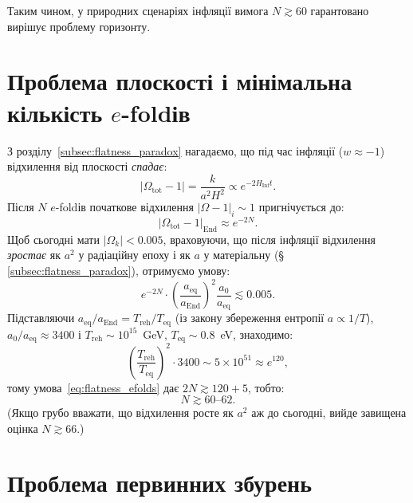 Таким чином, у природних сценаріях інфляції вимога $N \gtrsim 60$
гарантовано вирішує проблему горизонту.

\section{Проблема плоскості і мінімальна кількість $e$-foldів}
\label{sec:flatness_efolds}

З розділу~\ref{subsec:flatness_paradox} нагадаємо, що під час інфляції
($w \approx -1$) відхилення від плоскості \emph{спадає}:
\begin{equation*}
	|\Omega_{\text{tot}} - 1| = \frac{k}{a^2 H^2} \propto e^{-2H_{\text{Inf}} t}.
\end{equation*}
Після $N$ $e$-foldів початкове відхилення $|\Omega - 1|_i \sim 1$
пригнічується до:
\begin{equation*}
	|\Omega_{\text{tot}} - 1|_{\text{End}} \approx e^{-2N}.
\end{equation*}
Щоб сьогодні мати $|\Omega_k| < 0.005$, враховуючи, що після інфляції
відхилення \emph{зростає} як $a^2$ у радіаційну епоху і як $a$ у матеріальну
(§\,\ref{subsec:flatness_paradox}), отримуємо умову:
\begin{equation}\label{eq:flatness_efolds}
	e^{-2N} \cdot \left(\frac{a_{\text{eq}}}{a_{\text{End}}}\right)^2\frac{a_0}{a_{\text{eq}}} \lesssim 0.005.
\end{equation}
Підставляючи $a_{\text{eq}}/a_{\text{End}} = T_{\text{reh}}/T_{\text{eq}}$
(із закону збереження ентропії $a \propto 1/T$), $a_0/a_{\text{eq}} \approx 3400$ і
$T_{\text{reh}} \sim 10^{15}$~GeV, $T_{\text{eq}} \sim 0.8$~eV, знаходимо:
\begin{equation*}
	\left(\frac{T_{\text{reh}}}{T_{\text{eq}}}\right)^2\cdot 3400 \sim 5\times 10^{51} \approx e^{120},
\end{equation*}
тому умова~\eqref{eq:flatness_efolds} дає $2N \gtrsim 120 + 5$, тобто:
\begin{equation}\label{eq:N_min}
	\boxed{N \gtrsim 60\text{--}62.}
\end{equation}
(Якщо грубо вважати, що відхилення росте як $a^2$ аж до сьогодні, вийде завищена оцінка $N\gtrsim66$.)

\section{Проблема первинних збурень}
\label{sec:primordial_perturbations_bridge}

